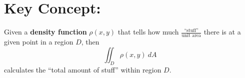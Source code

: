 %
%
%
%
%
%
%
%
%
%
%
%
%
%
%
%
%
%
%
%
%
%
%
%


\hspace*{-.8in}%

\section*{Key Concept:}

Given a \textbf{density function} \(\rho(x,y)\) that tells how much \(\frac{\text{``stuff''}}{\text{unit area}}\) there is at a given point in a region \(D\), then
\[
\iint_D \rho(x,y)\ dA
\]
calculates the ``total amount of stuff'' within region \(D\).\\~\\

